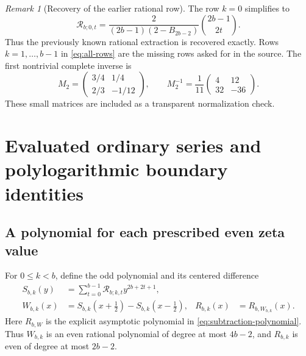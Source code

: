 \documentclass[11pt,letterpaper]{article}
\theoremstyle{definition}
\theoremstyle{remark}
\newtheorem{remark}[theorem]{Remark}
\numberwithin{equation}{section}
\begin{document}
\begin{remark}[Recovery of the earlier rational row]
The row $k=0$ simplifies to
\begin{equation}\label{eq:rational-row}
 \mathcal R_{b;0,t}=
 \frac{2}{(2b-1)(2-B_{2b-2})}\binom{2b-1}{2t}.
\end{equation}
Thus the previously known rational extraction is recovered exactly.
Rows $k=1,\ldots,b-1$ in \eqref{eq:all-rows} are the missing rows
asked for in the source. The first nontrivial complete inverse is
\begin{equation}\label{eq:b2inverse}
 M_2=
 \begin{pmatrix}3/4&1/4\\2/3&-1/12\end{pmatrix},\qquad
 M_2^{-1}=\frac1{11}
 \begin{pmatrix}4&12\\32&-36\end{pmatrix}.
\end{equation}
These small matrices are included as a transparent normalization check.
\end{remark}



\section{Evaluated ordinary series and polylogarithmic boundary identities}
\label{sec:filters}

\subsection{A polynomial for each prescribed even zeta value}

For $0\leq k<b$, define the odd polynomial and its centered difference
\begin{align}
 S_{b,k}(y)&=\sum_{t=0}^{b-1}\mathcal R_{b;k,t}y^{2b+2t+1},
 \label{eq:S-filter}\\
 W_{b,k}(x)&=S_{b,k}(x+\tfrac12)-S_{b,k}(x-\tfrac12),
 &R_{b,k}(x)&=R_{b,W_{b,k}}(x).
 \label{eq:W-filter}
\end{align}
Here $R_{b,W}$ is the explicit asymptotic polynomial in
\eqref{eq:subtraction-polynomial}. Thus $W_{b,k}$ is an even rational
polynomial of degree at most $4b-2$, and $R_{b,k}$ is even of degree
at most $2b-2$.
\end{document}
